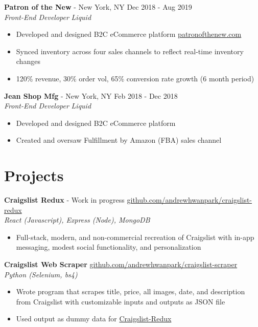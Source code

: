 \documentclass[margin]{res}
\begin{document}
\begin{resume}
	{\bf Patron of the New} - New York, NY \hfill  Dec 2018 - Aug 2019\\
	{\it Front-End Developer} \hfill {\it Liquid}
	\begin{itemize} \itemsep -2pt %
		\item Developed and designed B2C eCommerce platform \hfill \href{https://patronofthenew.com}{patronofthenew.com}
		\item Synced inventory across four sales channels to reflect real-time inventory changes
		\item 120\% revenue, 30\% order vol, 65\% conversion rate growth (6 month period)
	\end{itemize}
	
	{\bf Jean Shop Mfg} - New York, NY \hfill Feb 2018 - Dec 2018\\
	{\it Front-End Developer} \hfill {\it Liquid}
	\begin{itemize} \itemsep -2pt
		\item Developed and designed B2C eCommerce platform
		\item Created and oversaw Fulfillment by Amazon (FBA) sales channel
	\end{itemize}
	
	\section{Projects} 
	{\bf Craigslist Redux} - Work in progress \hfill \href{https://github.com/andrewhwanpark/craigslist-redux}{github.com/andrewhwanpark/craigslist-redux}\\
	{\it React (Javascript), Express (Node), MongoDB}
	\begin{itemize} \itemsep -2pt
		\item Full-stack, modern, and non-commercial recreation of Craigslist with in-app messaging, modest social functionality, and personalization
	\end{itemize}
	
	{\bf Craigslist Web Scraper} \hfill \href{https://github.com/andrewhwanpark/craigslist-scraper}{github.com/andrewhwanpark/craigslist-scraper}\\
	{\it Python (Selenium, bs4)}
	\begin{itemize} \itemsep -2pt
		\item Wrote program that scrapes title, price, all images, date, and description from Craigslist with customizable inputs and outputs as JSON file
		\item Used output as dummy data for \href{https://github.com/andrewhwanpark/craigslist-redux}{Craigslist-Redux}
	\end{itemize}
	

\end{resume}
\end{document}
